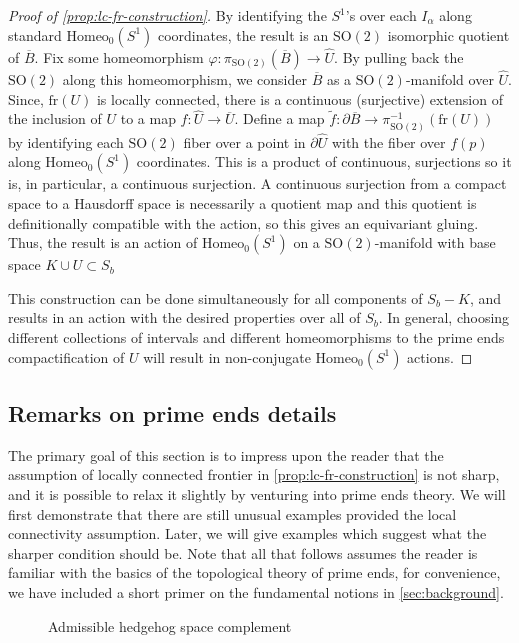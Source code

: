 \documentclass[10pt, oneside]{article}
\newcommand{\SO}[1][2]{\text{SO}(#1)}
\newcommand{\homeo}[1][S^1]{\text{Homeo}_0(#1)}
\newcommand{\cl}[1]{\overline{#1}}
\newcommand{\fr}[1]{\text{fr}(#1)}
\theoremstyle{definition}
\theoremstyle{definition}
\begin{document}
\begin{proof}[Proof of \cref{prop:lc-fr-construction}]
    By identifying the $S^1$'s over each $I_\alpha$ along standard $\homeo$ coordinates, the result is an $\SO$ isomorphic quotient of $\cl{B}$. Fix some homeomorphism $\varphi: \pi_{\SO}(\cl{B}) \to \hat{U}$. By pulling back the $\SO$ along this homeomorphism, we consider $\cl{B}$ as a $\SO$-manifold over $\hat{U}$. Since, $\fr{U}$ is locally connected, there is a continuous (surjective) extension of the inclusion of $U$ to a map $f:\hat{U}\to \cl{U}$\cite{mather:TopologicalProofs}. Define a map $\tilde{f}:\partial\cl{B}\to\pi_{\SO}^{-1}(\fr{U})$ by identifying each $\SO$ fiber over a point in $\partial\hat{U}$ with the fiber over $f(p)$ along $\homeo$ coordinates. This is a product of continuous, surjections so it is, in particular, a continuous surjection. A continuous surjection from a compact space to a Hausdorff space is necessarily a quotient map and this quotient is definitionally compatible with the action, so this gives an equivariant gluing. Thus, the result is an action of $\homeo$ on a $\SO$-manifold with base space $K\cup U\subset S_b$

    This construction can be done simultaneously for all components of $S_b - K$, and results in an action with the desired properties over all of $S_b$. In general, choosing different collections of intervals and different homeomorphisms to the prime ends compactification of $U$ will result in non-conjugate $\homeo$ actions.
\end{proof}

\subsection{Remarks on prime ends details}\label{subsec:prime-ends}
The primary goal of this section is to impress upon the reader that the assumption of locally connected frontier in \cref{prop:lc-fr-construction} is not sharp, and it is possible to relax it slightly by venturing into prime ends theory. We will first demonstrate that there are still unusual examples provided the local connectivity assumption. Later, we will give examples which suggest what the sharper condition should be. Note that all that follows assumes the reader is familiar with the basics of the topological theory of prime ends, for convenience, we have included a short primer on the fundamental notions in \cref{sec:background}.

\begin{figure}
    \centering
    
    \caption{Admissible hedgehog space complement}
    \label{fig:admissible-hedgehog}
\end{figure}
\end{document}
